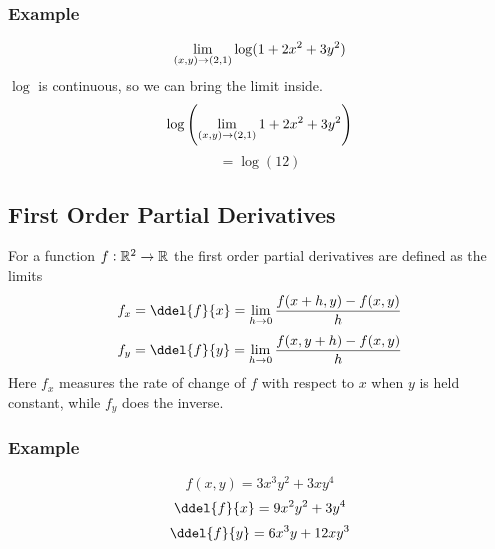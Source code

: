 \documentclass[12pt]{report}
\begin{document}
\begin{flushleft}
\subsubsection*{Example}

\begin{center}
    \[\lim\limits_{(x, y) \rightarrow (2, 1)} \log(1 + 2x^2 + 3y^2)\]
    \(\log\) is continuous, so we can bring the limit inside.
    \[\log\left(\lim\limits_{(x, y) \rightarrow (2, 1)} 1 + 2x^2 + 3y^2\right)\]
    \[= \log(12)\]
\end{center}

\subsection*{First Order Partial Derivatives}

For a function \(f: \mathbb{R}^2 \rightarrow \mathbb{R}\) the first order partial derivatives
are defined as the limits
\[f_x = \ddel{f}{x} = \limit_{h \rightarrow 0}\frac{f(x + h, y) - f(x, y)}{h}\]
\[f_y = \ddel{f}{y} = \limit_{h \rightarrow 0}\frac{f(x, y + h) - f(x, y)}{h}\]
Here \(f_x\) measures the rate of change of \(f\) with respect to \(x\) when
\(y\) is held constant, while \(f_y\) does the inverse.

\subsubsection*{Example}
\[f(x, y) = 3x^3y^2 + 3xy^4\]
\[\ddel{f}{x} = 9x^2y^2 + 3y^4\]
\[\ddel{f}{y} = 6x^3y + 12xy^3\]

\end{flushleft}
\end{document}
